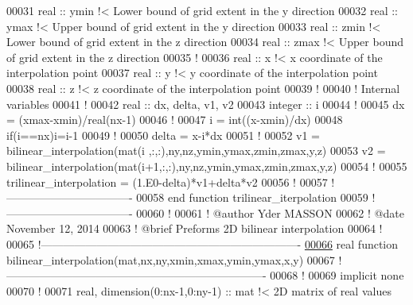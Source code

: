 \begin{DoxyCode}
00031 \textcolor{keywordtype}{real} :: ymin \textcolor{comment}{!< Lower bound of grid extent in the y direction }
00032 \textcolor{keywordtype}{real} :: ymax \textcolor{comment}{!< Upper bound of grid extent in the y direction}
00033 \textcolor{keywordtype}{real} :: zmin \textcolor{comment}{!< Lower bound of grid extent in the z direction}
00034 \textcolor{keywordtype}{real} :: zmax \textcolor{comment}{!< Upper bound of grid extent in the z direction}
00035 \textcolor{comment}{!}
00036 \textcolor{keywordtype}{real} :: x \textcolor{comment}{!< x coordinate of the interpolation point }
00037 \textcolor{keywordtype}{real} :: y \textcolor{comment}{!< y coordinate of the interpolation point }
00038 \textcolor{keywordtype}{real} :: z \textcolor{comment}{!< z coordinate of the interpolation point}
00039 \textcolor{comment}{!}
00040 \textcolor{comment}{! Internal variables}
00041 \textcolor{comment}{!}
00042 \textcolor{keywordtype}{real} :: dx, delta, v1, v2
00043 \textcolor{keywordtype}{integer} :: i
00044 \textcolor{comment}{!}
00045 dx = (xmax-xmin)/\textcolor{keywordtype}{real}(nx-1)
00046 \textcolor{comment}{!}
00047 i = int((x-xmin)/dx)
00048 \textcolor{keyword}{if}(i==nx)i=i-1
00049 \textcolor{comment}{!}
00050 delta = x-i*dx
00051 \textcolor{comment}{!}
00052 v1 = bilinear\_interpolation(mat(i  ,:,:),ny,nz,ymin,ymax,zmin,zmax,y,z)
00053 v2 = bilinear\_interpolation(mat(i+1,:,:),ny,nz,ymin,ymax,zmin,zmax,y,z)
00054 \textcolor{comment}{!}
00055 trilinear\_interpolation = (1.E0-delta)*v1+delta*v2 
00056 \textcolor{comment}{!}
00057 \textcolor{comment}{!----------------------------------}
00058 \textcolor{keyword}{end function trilinear\_iterpolation}
00059 \textcolor{comment}{!----------------------------------}
00060 \textcolor{comment}{!}
00061 \textcolor{comment}{! @author Yder MASSON}
00062 \textcolor{comment}{! @date November 12, 2014}
00063 \textcolor{comment}{! @brief Preforms 2D bilinear interpolation }
00064 \textcolor{comment}{!}
00065 \textcolor{comment}{!----------------------------------------------------------------------}
\hypertarget{module__interpolation_8f90_source_l00066}{}\hyperlink{classmodule__interpolation_ad2c12cef852fdbaceaae5999778eb885}{00066} \textcolor{keyword}{real }\textcolor{keyword}{function }bilinear\_interpolation(mat,nx,ny,xmin,xmax,ymin,ymax,x,y)
00067 \textcolor{comment}{!----------------------------------------------------------------------}
00068 \textcolor{comment}{!}
00069 \textcolor{keyword}{implicit none}
00070 \textcolor{comment}{!}
00071 \textcolor{keywordtype}{real}, \textcolor{keywordtype}{dimension(0:nx-1,0:ny-1)} :: mat \textcolor{comment}{!< 2D matrix of real values }

\end{DoxyCode}
